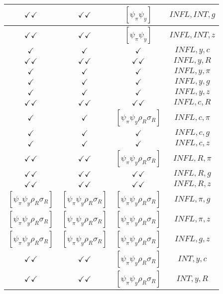 \documentclass[a4paper,10pt]{article}
\begin{document}
\begin{longtable}{|c|c|c|c|}
\hline
$\checkmark\checkmark$ & $\checkmark\checkmark$ & $[\psi_\pi \psi_y ]$ & ${INFL},{INT},{g}$ \\
\hline
$\checkmark\checkmark$ & $\checkmark\checkmark$ & $[\psi_\pi \psi_y ]$ & ${INFL},{INT},{z}$ \\
\hline
$\checkmark$ & $\checkmark$ & $\checkmark$ & ${INFL},{y},{c}$ \\
\hline
$\checkmark\checkmark$ & $\checkmark\checkmark$ & $\checkmark\checkmark$ & ${INFL},{y},{R}$ \\
\hline
$\checkmark$ & $\checkmark$ & $\checkmark$ & ${INFL},{y},{\pi}$ \\
\hline
$\checkmark$ & $\checkmark$ & $\checkmark$ & ${INFL},{y},{g}$ \\
\hline
$\checkmark$ & $\checkmark$ & $\checkmark$ & ${INFL},{y},{z}$ \\
\hline
$\checkmark\checkmark$ & $\checkmark\checkmark$ & $\checkmark\checkmark$ & ${INFL},{c},{R}$ \\
\hline
$\checkmark$ & $\checkmark$ & $[\psi_\pi \psi_y \rho_R \sigma_R ]$ & ${INFL},{c},{\pi}$ \\
\hline
$\checkmark$ & $\checkmark$ & $\checkmark$ & ${INFL},{c},{g}$ \\
\hline
$\checkmark$ & $\checkmark$ & $\checkmark$ & ${INFL},{c},{z}$ \\
\hline
$\checkmark\checkmark$ & $\checkmark\checkmark$ & $[\psi_\pi \psi_y \rho_R \sigma_R ]$ & ${INFL},{R},{\pi}$ \\
\hline
$\checkmark\checkmark$ & $\checkmark\checkmark$ & $\checkmark\checkmark$ & ${INFL},{R},{g}$ \\
\hline
$\checkmark\checkmark$ & $\checkmark\checkmark$ & $\checkmark\checkmark$ & ${INFL},{R},{z}$ \\
\hline
$[\psi_\pi \psi_y \rho_R \sigma_R ]$ & $[\psi_\pi \psi_y \rho_R \sigma_R ]$ & $[\psi_\pi \psi_y \rho_R \sigma_R ]$ & ${INFL},{\pi},{g}$ \\
\hline
$[\psi_\pi \psi_y \rho_R \sigma_R ]$ & $[\psi_\pi \psi_y \rho_R \sigma_R ]$ & $[\psi_\pi \psi_y \rho_R \sigma_R ]$ & ${INFL},{\pi},{z}$ \\
\hline
$[\psi_\pi \psi_y \rho_R \sigma_R ]$ & $[\psi_\pi \psi_y \rho_R \sigma_R ]$ & $[\psi_\pi \psi_y \rho_R \sigma_R ]$ & ${INFL},{g},{z}$ \\
\hline
$\checkmark\checkmark$ & $\checkmark\checkmark$ & $[\psi_\pi \psi_y \rho_R \sigma_R ]$ & ${INT},{y},{c}$ \\
\hline
$\checkmark\checkmark$ & $\checkmark\checkmark$ & $[\psi_\pi \psi_y \rho_R \sigma_R ]$ & ${INT},{y},{R}$ \\

\end{longtable}
\end{document}
